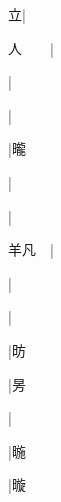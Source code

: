\begin{multicols}{2}
{{\cjk{}{\cnsym{}　}{\cnsym{}　}立}|{}\par
{\cjk{}人{\cnsym{}　}{\cnsym{}　}}|{}\par
{\cjk{}{\cnsym{}　}{\cnsym{}　}{\cnsym{}　}}|{}\par
{\cjk{}{\cnsym{}　}{\cnsym{}　}{\cnsym{}　}}|{}\par
{\cjk{}{\cnsym{}　}{\cnsym{}　}{\cnsym{}　}}|{\cjk{}曨}\par
{\cjk{}{\cnsym{}　}{\cnsym{}　}{\cnsym{}　}}|{}\par
{\cjk{}{\cnsym{}　}{\cnsym{}　}{\cnsym{}　}}|{}\par
{\cjk{}羊凡{\cnsym{}　}}|{}\par
{\cjk{}{\cnsym{}　}{\cnsym{}　}{\cnsym{}　}}|{}\par
{\cjk{}{\cnsym{}　}{\cnsym{}　}{\cnsym{}　}}|{}\par
{\cjk{}{\cnsym{}　}{\cnsym{}　}{\cnsym{}　}}|{\cjk{}昉}\par
{\cjk{}{\cnsym{}　}{\cnsym{}　}{\cnsym{}　}}|{\cjk{}昘}\par
{\cjk{}{\cnsym{}　}{\cnsym{}　}{\cnsym{}　}}|{}\par
{\cjk{}{\cnsym{}　}{\cnsym{}　}{\cnsym{}　}}|{\cjk{}暆}\par
{\cjk{}{\cnsym{}　}{\cnsym{}　}{\cnsym{}　}}|{\cjk{}暶}\par
}
\end{multicols}
